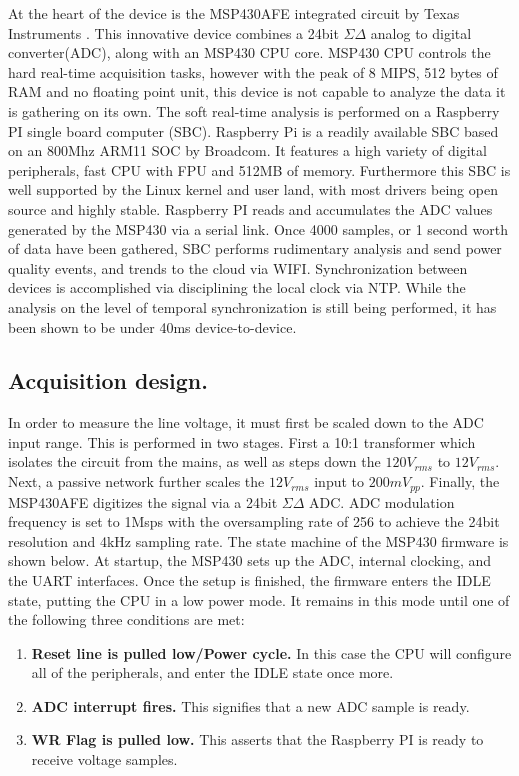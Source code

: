 At the heart of the device is the MSP430AFE integrated circuit by Texas Instruments \textregistered. \cite{MSP430AFE} This innovative device combines a 24bit $\Sigma\Delta$ analog to digital converter(ADC), along with an MSP430 CPU core. MSP430 CPU controls the hard real-time acquisition tasks, however with the peak of 8 MIPS, 512 bytes of RAM and no floating point unit, this device is not capable to analyze the data it is gathering on its own. The soft real-time analysis is performed on a Raspberry PI single board computer (SBC). \cite{RaspberryPI} Raspberry Pi is a readily available SBC based on an 800Mhz ARM11 SOC by Broadcom\textregistered. It features a high variety of digital peripherals, fast CPU with FPU and 512MB of memory. Furthermore this SBC is well supported by the Linux kernel and user land, with most drivers being open source and highly stable. Raspberry PI reads and accumulates the ADC values generated by the MSP430 via a serial link. Once 4000 samples, or 1 second worth of data have been gathered, SBC performs rudimentary analysis and send power quality events, and trends to the cloud via WIFI. Synchronization between devices is accomplished via disciplining the local clock via NTP. While the analysis on the level of temporal synchronization is still being performed, it has been shown to be under 40ms device-to-device.

\subsection{Acquisition design.}

In order to measure the line voltage, it must first be scaled down to the ADC input range. This is performed in two stages. First a 10:1 transformer which isolates the circuit from the mains, as well as steps down the $120V_{rms}$ to $12V_{rms}$. Next, a passive network further scales the $12V_{rms}$ input to $200mV_{pp}$. Finally, the MSP430AFE digitizes the signal via a 24bit $\Sigma\Delta$ ADC. ADC modulation frequency is set to 1Msps with the oversampling rate of 256 to achieve the 24bit resolution and 4kHz sampling rate. The state machine of the MSP430 firmware is shown below. At startup, the MSP430 sets up the ADC, internal clocking, and the UART interfaces. Once the setup is finished, the firmware enters the IDLE state, putting the CPU in a low power mode. It remains in this mode until one of the following three conditions are met:

\begin{enumerate}
\item \textbf{Reset line is pulled low/Power cycle.} In this case the CPU will configure all of the peripherals, and enter the IDLE state once more.
\item \textbf{ADC interrupt fires.} This signifies that a new ADC sample is ready.
\item \textbf{WR Flag is pulled low.} This asserts that the Raspberry PI is ready to receive voltage samples.
\end{enumerate}


